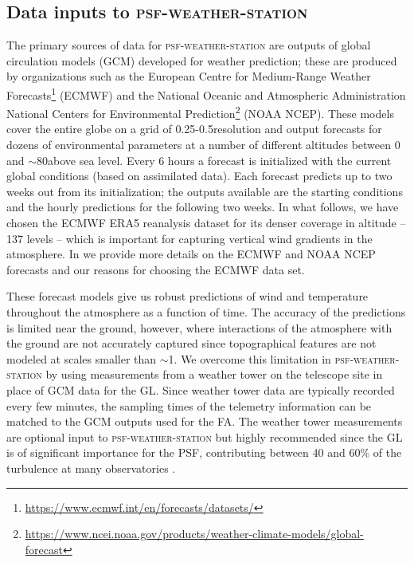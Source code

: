 \documentclass[twocolumn]{aastex631}
\newcommand{\psfws}{\textsc{psf-weather-station}\xspace}
\begin{document}
\subsection{Data inputs to \psfws}
The primary sources of data for \psfws are outputs of global circulation models (GCM) developed for weather prediction; these are produced by organizations such as the European Centre for Medium-Range Weather Forecasts\footnote{\url{https://www.ecmwf.int/en/forecasts/datasets/}} (ECMWF) and the National Oceanic and Atmospheric Administration National Centers for Environmental Prediction\footnote{\url{https://www.ncei.noaa.gov/products/weather-climate-models/global-forecast}} (NOAA NCEP).
These models cover the entire globe on a grid of 0.25-0.5\deg resolution and output forecasts for dozens of environmental parameters at a number of different altitudes between 0 and $\sim$80\km above sea level.
Every 6 hours a forecast is initialized with the current global conditions (based on assimilated data). 
Each forecast predicts up to two weeks out from its initialization; the outputs available are the starting conditions and the hourly predictions for the following two weeks.
In what follows, we have chosen the ECMWF ERA5 reanalysis dataset for its denser coverage in altitude -- 137 levels -- which is important for capturing vertical wind gradients in the atmosphere. 
In  we provide more details on the ECMWF and NOAA NCEP forecasts and our reasons for choosing the ECMWF data set.

These forecast models give us robust predictions of wind and temperature throughout the atmosphere as a function of time. 
The accuracy of the predictions is limited near the ground, however, where interactions of the atmosphere with the ground are not accurately captured since topographical features are not modeled at scales smaller than $\sim$1\km. 
We overcome this limitation in \psfws by using measurements from a weather tower on the telescope site in place of GCM data for the GL.
Since weather tower data are typically recorded every few minutes, the sampling times of the telemetry information can be matched to the GCM outputs used for the FA.
The weather tower measurements are optional input to \psfws but highly recommended since the GL is of significant importance for the PSF, contributing between 40 and 60\% of the turbulence at many observatories \citep{tokovinin_model_2005, tokovinin_optical_2005, tokovinin_statistics_2003}.
\end{document}
